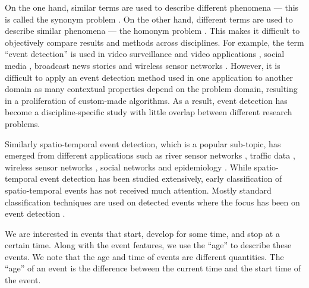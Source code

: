 \documentclass[a4paper,11pt]{article}
\begin{document}
On the one hand, similar terms are used to describe different phenomena --- this is called the synonym problem \cite{zhou2014spatiotemporal}. On the other hand, different terms are used to describe similar phenomena --- the homonym problem \cite{zhou2014spatiotemporal}. This makes it difficult to objectively compare results and methods across disciplines. For example, the term ``event detection'' is used in video surveillance and video applications \cite{adam2008robust, ke2005efficient, medioni2001event}, social media \cite{weng2011event, li2012tedas, abdelhaq2013eventweet}, broadcast news stories \cite{allan1998line, li2005probabilistic} and wireless sensor networks \cite{yin2009spatio, mao2015online}. However, it is difficult to apply an event detection method used in one application to another domain as many contextual properties depend on the problem domain, resulting in a proliferation of custom-made algorithms. As a result, event detection has become a discipline-specific study with little overlap between different research problems.

Similarly spatio-temporal event detection, which is a popular sub-topic, has emerged from different applications such as river sensor networks \cite{mao2015online}, traffic data \cite{souto2016event}, wireless sensor networks \cite{mousavi2013spatio}, social networks \cite{cheng2014event} and epidemiology \cite{gomide2011dengue}. While spatio-temporal event detection has been studied extensively, early classification of spatio-temporal events has not received much attention. Mostly standard classification techniques are used on detected events where the focus has been on event detection \cite{kang2014detecting}.


We are interested in events that start, develop for some time, and stop at a certain time. Along with the event features, we use the ``age'' to describe these events. We note that the age and time of events are different quantities. The ``age'' of an event is the difference between the current time and the start time of the event.
\end{document}
